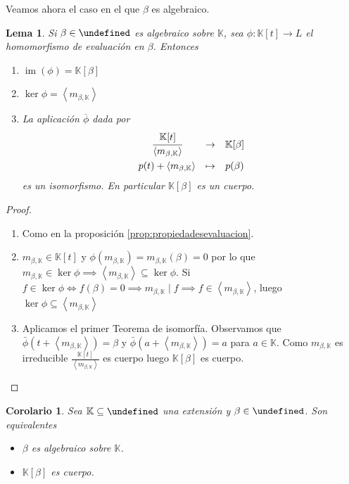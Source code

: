 \documentclass[10pt, spanish]{report}
\newtheorem{lema}[tma]{Lema}
\newtheorem{cor}{Corolario}[tma]
\theoremstyle{definition}
\newcommand{\K}{\mathbb{K}}
\let\L\undefined
\newcommand{\L}{\mathbb{L}}
\newcommand{\im}[1]{\operatorname{im}\left(#1\right)}
\begin{document}
Veamos ahora el caso en el que $\beta$ es algebraico.

\begin{lema}
    Si $\beta\in\L$ es algebraico sobre $\K$, sea $\phi:\K[t]\to L$ el
    homomorfismo de evaluación en $\beta$. Entonces
    \begin{enumerate}
        \item $\im{\phi}=\K[\beta]$
        \item $\ker{\phi}=\left<m_{\beta,\K}\right>$
        \item La aplicación $\overline{\phi}$ dada por
            \[\begin{matrix*}
                \cfrac{\K[t]}{\left<m_{\beta,\K}\right>}&\to&\K[\beta]\\[1em]
                p(t)+\left< m_{\beta,\K} \right>&\mapsto&p(\beta)
            \end{matrix*}\]
            es un isomorfismo. En particular $\K[\beta]$ es un cuerpo.
    \end{enumerate}
\end{lema}

\begin{proof}\hspace{0pt}
    \begin{enumerate}
        \item Como en la proposición \ref{prop:propiedadesevaluacion}.
        \item $m_{\beta,\K}\in\K[t]$ y $\phi(m_{\beta,\K})=m_{\beta,\K}(\beta)
            =0$ por lo que $m_{\beta,\K}\in \ker{\phi} \implies \left<
            m_{\beta,\K} \right> \subseteq \ker{\phi}$. Si $f\in\ker{\phi}
            \Leftrightarrow f(\beta)=0 \implies m_{\beta,\K}\mid f \implies f\in
            \left< m_{\beta,\K}\right> $, luego $\ker{\phi}\subseteq\left<
            m_{\beta,\K} \right> $
        \item Aplicamos el primer Teorema de isomorfía. Observamos que
            $\bar{\phi}(t+\left< m_{\beta,\K} \right>)=\beta$ y
            $\bar{\phi}(a+\left< m_{\beta,\K} \right>)=a$ para $a\in\K$. Como
            $m_{\beta,\K}$ es irreducible $\frac{\K[t]}{\left< m_{\beta,\K}
            \right> }$ es cuerpo luego $\K[\beta]$ es cuerpo.
    \end{enumerate}
    \vspace{-1.75em}
\end{proof}

\begin{cor}\label{cor:carcuerposelalg}
    Sea $\K\subseteq\L$ una extensión y $\beta\in \L$. Son equivalentes
    \begin{itemize}
        \item $\beta$ es algebraico sobre $\K$.
        \item $\K[\beta]$ es cuerpo.
    \end{itemize}
\end{cor}
\end{document}
